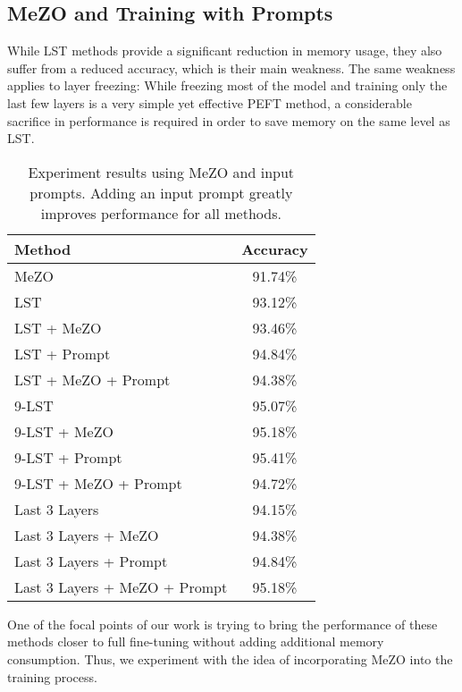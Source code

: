 \subsection{MeZO and Training with Prompts}
While LST methods provide a significant reduction in memory usage, they also suffer from a reduced accuracy, which is their main weakness. The same weakness applies to layer freezing: While freezing most of the model and training only the last few layers is a very simple yet effective PEFT method, a considerable sacrifice in performance is required in order to save memory on the same level as LST. 

\begin{table}[htb]
    \caption{Experiment results using MeZO and input prompts. Adding an input prompt greatly improves performance for all methods.}
    \label{table: mezo_results}
    \centering
    \begin{tabular}{lc}
        \toprule
        Method &  Accuracy \\
        \midrule
        MeZO    &   91.74\% \\
        LST & 93.12\% \\
        LST + MeZO & 93.46\% \\
        LST + Prompt & 94.84\%\\
        LST + MeZO + Prompt & 94.38\%\\
        \midrule
        9-LST & 95.07\%\\
        9-LST + MeZO & 95.18\%\\
        9-LST + Prompt & 95.41\%\\
        9-LST + MeZO + Prompt & 94.72\%\\
        \midrule
        Last 3 Layers & 94.15\%\\
        Last 3 Layers + MeZO & 94.38\%\\
        Last 3 Layers + Prompt & 94.84\%\\
        Last 3 Layers + MeZO + Prompt & 95.18\%\\
        \bottomrule
    \end{tabular}
\end{table}



One of the focal points of our work is trying to bring the performance of these methods closer to full fine-tuning without adding additional memory consumption. Thus, we experiment with the idea of incorporating MeZO into the training process.

